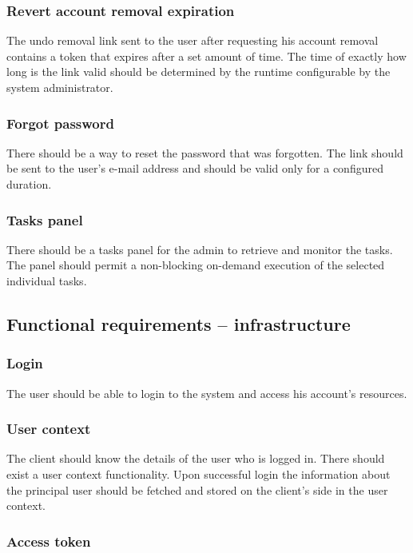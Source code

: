 \documentclass[a4paper,twoside,12pt]{book}
\begin{document}
\subsubsection{Revert account removal expiration}

The undo removal link sent to the user after requesting his account removal contains a token that expires after a set amount of time. The time of exactly how long is the link valid should be determined by the runtime configurable by the system administrator.

\subsubsection{Forgot password}

There should be a way to reset the password that was forgotten. The link should be sent to the user's e-mail address and should be valid only for a configured duration.

\subsubsection{Tasks panel}

There should be a tasks panel for the admin to retrieve and monitor the tasks. The panel should permit a non-blocking on-demand execution of the selected individual tasks.


\subsection{Functional requirements – infrastructure}

\subsubsection{Login}

The user should be able to login to the system and access his account's resources.

\subsubsection{User context}

The client should know the details of the user who is logged in. There should exist a user context functionality. Upon successful login the information about the principal user should be fetched and stored on the client's side in the user context.

\subsubsection{Access token}
\end{document}
